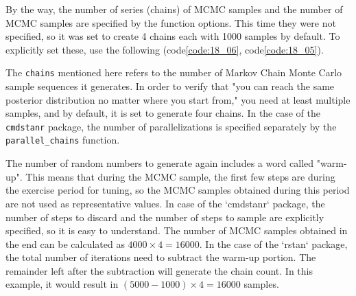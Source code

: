 \documentclass{ltjsbook}
\begin{document}
By the way, the number of series (chains) of MCMC samples and the number of MCMC samples are specified by the function options. This time they were not specified, so it was set to create 4 chains each with 1000 samples by default. To explicitly set these, use the following (code\ref{code:18_06}, code\ref{code:18_05}).






The \texttt{chains} mentioned here refers to the number of Markov Chain Monte Carlo sample sequences it generates. In order to verify that "you can reach the same posterior distribution no matter where you start from," you need at least multiple samples, and by default, it is set to generate four chains. In the case of the \texttt{cmdstanr} package, the number of parallelizations is specified separately by the \verb|parallel_chains| function.

The number of random numbers to generate again includes a word called "warm-up". This means that during the MCMC sample, the first few steps are during the exercise period for tuning, so the MCMC samples obtained during this period are not used as representative values. In case of the `cmdstanr` package, the number of steps to discard and the number of steps to sample are explicitly specified, so it is easy to understand. The number of MCMC samples obtained in the end can be calculated as $4000\times 4=16000$. In the case of the `rstan` package, the total number of iterations need to subtract the warm-up portion. The remainder left after the subtraction will generate the chain count. In this example, it would result in $(5000-1000)\times 4=16000$ samples.
\end{document}
